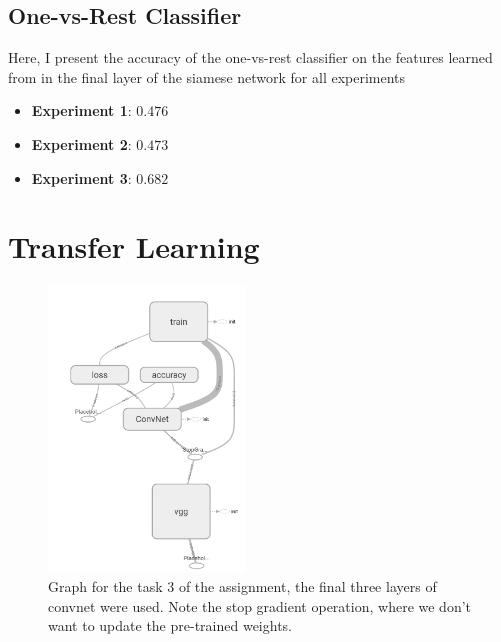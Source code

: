 \documentclass{article}
\begin{document}
\subsection{One-vs-Rest Classifier}
Here, I present the accuracy of the one-vs-rest classifier on the features learned from in the final layer of the siamese network for all experiments
\begin{itemize}
\item \textbf{Experiment 1}: $0.476$
\item \textbf{Experiment 2}: $0.473$
\item \textbf{Experiment 3}: $\mathbf{0.682}$
\end{itemize}

\section{Transfer Learning}
 
 
 \begin{figure}[h!]
\centering
\includegraphics[width=5.2cm]{graph.png}
\caption{Graph for the task 3 of the assignment, the final three layers of convnet were used. Note the stop gradient operation, where we don't want to update the pre-trained weights.}
\label{fig:features}
\end{figure}
 
%
%
\end{document}
